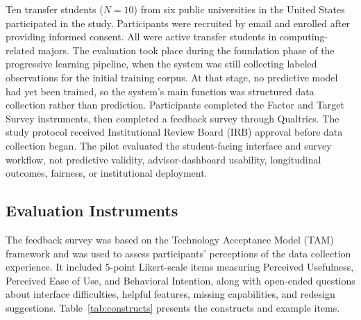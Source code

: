 \documentclass[letterpaper,11pt]{article}
\begin{document}
%
%
Ten transfer students ($N=10$) from six public universities in the United States participated in the study. Participants were recruited by email and enrolled after providing informed consent. All were active transfer students in computing-related majors. The evaluation took place during the foundation phase of the progressive learning pipeline, when the system was still collecting labeled observations for the initial training corpus. At that stage, no predictive model had yet been trained, so the system's main function was structured data collection rather than prediction. Participants completed the Factor and Target Survey instruments, then completed a feedback survey through Qualtrics. The study protocol received Institutional Review Board (IRB) approval before data collection began. The pilot evaluated the student-facing interface and survey workflow, not predictive validity, advisor-dashboard usability, longitudinal outcomes, fairness, or institutional deployment.

\subsection{Evaluation Instruments}\label{subsec:instruments}

The feedback survey was based on the Technology Acceptance Model (TAM) framework \parencite{davis1989} and was used to assess participants' perceptions of the data collection experience. It included 5-point Likert-scale items measuring Perceived Usefulness, Perceived Ease of Use, and Behavioral Intention, along with open-ended questions about interface difficulties, helpful features, missing capabilities, and redesign suggestions. Table~\ref{tab:constructs} presents the constructs and example items.
\end{document}
